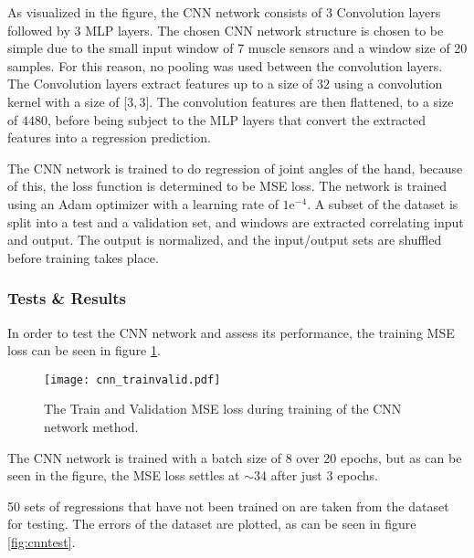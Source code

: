 \documentclass[../main.tex]{subfiles}
\begin{document}
As visualized in the figure, the CNN network consists of 3 Convolution layers followed by 3 MLP layers.
The chosen CNN network structure is chosen to be simple due to the small input window of 7 muscle sensors and a window size of 20 samples.
For this reason, no pooling was used between the convolution layers.
The Convolution layers extract features up to a size of 32 using a convolution kernel with a size of [$3, 3$].
The convolution features are then flattened, to a size of $4480$, before being subject to the MLP layers that convert the extracted features into a regression prediction. 

The CNN network is trained to do regression of joint angles of the hand, because of this, the loss function is determined to be MSE loss.
The network is trained using an Adam optimizer with a learning rate of $1\text{e}^{-4}$.
A subset of the dataset is split into a test and a validation set, and windows are extracted correlating input and output.
The output is normalized, and the input/output sets are shuffled before training takes place.

\subsubsection{Tests \& Results}

In order to test the CNN network and assess its performance, the training MSE loss can be seen in figure \ref{fig:cnntrainvalid}.

\begin{figure}[H]
\begin{center}
\texttt{[image: cnn\_trainvalid.pdf]}
\caption{The Train and Validation MSE loss during training of the CNN network method.}
\label{fig:cnntrainvalid}
\end{center}
\end{figure}

The CNN network is trained with a batch size of 8 over 20 epochs, but as can be seen in the figure, the MSE loss settles at $\sim 34$ after just 3 epochs.

50 sets of regressions that have not been trained on are taken from the dataset for testing.
The errors of the dataset are plotted, as can be seen in figure \ref{fig:cnntest}.
\end{document}
